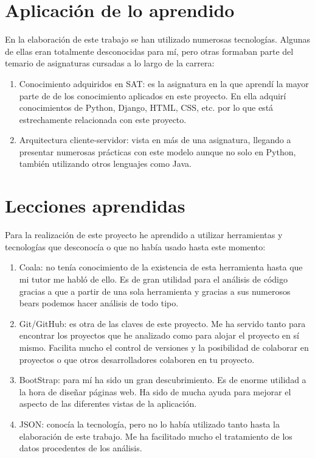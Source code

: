 \documentclass[a4paper, 12pt]{book}
\begin{document}
\section{Aplicación de lo aprendido}
\label{sec:aplicacion}
En la elaboración de este trabajo se han utilizado numerosas tecnologías. Algunas de ellas eran totalmente desconocidas para mí, pero otras formaban parte del temario de asignaturas cursadas a lo largo de la carrera:

\begin{enumerate}
  \item Conocimiento adquiridos en SAT: es la asignatura en la que aprendí la mayor parte de de los conocimiento aplicados en este proyecto. En ella adquirí conocimientos de Python, Django, HTML, CSS, etc. por lo que está estrechamente relacionada con este proyecto.
  \item Arquitectura cliente-servidor: vista en más de una asignatura, llegando a presentar numerosas prácticas con este modelo aunque no solo en Python, también utilizando otros lenguajes como Java.
\end{enumerate}


\section{Lecciones aprendidas}
\label{sec:lecciones_aprendidas}
Para la realización de este proyecto he aprendido a utilizar herramientas y tecnologías que desconocía o que no había usado hasta este momento:

\begin{enumerate}
  \item Coala: no tenía conocimiento de la existencia de esta herramienta hasta que mi tutor me habló de ello. Es de gran utilidad para el análisis de código gracias a que a partir de una sola herramienta y gracias a sus numerosos bears podemos hacer análisis de todo tipo.
  \item Git/GitHub: es otra de las claves de este proyecto. Me ha servido tanto para encontrar los proyectos que he analizado como para alojar el proyecto en sí mismo. Facilita mucho el control de versiones y la posibilidad de colaborar en proyectos o que otros desarrolladores colaboren en tu proyecto.
  \item BootStrap: para mí ha sido un gran descubrimiento. Es de enorme utilidad a la hora de diseñar páginas web. Ha sido de mucha ayuda para mejorar el aspecto de las diferentes vistas de la aplicación.
  \item JSON: conocía la tecnología, pero no lo había utilizado tanto hasta la elaboración de este trabajo. Me ha facilitado mucho el tratamiento de los datos procedentes de los análisis.
\end{enumerate}
\end{document}
